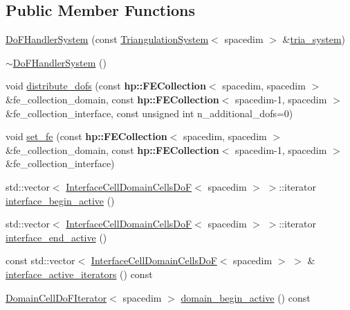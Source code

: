 \subsection*{Public Member Functions}
\begin{DoxyCompactItemize}
\item 
\hyperlink{class_do_f_handler_system_acb31af36eec0abac1d6e764e3d08c7fe}{Do\+F\+Handler\+System} (const \hyperlink{class_triangulation_system}{Triangulation\+System}$<$ spacedim $>$ \&\hyperlink{class_do_f_handler_system_a06d93193cb47591db138cd8f41953796}{tria\+\_\+system})
\item 
\hyperlink{class_do_f_handler_system_a5a2f0389f4f4216b9841d9c518cb107e}{$\sim$\+Do\+F\+Handler\+System} ()
\item 
void \hyperlink{class_do_f_handler_system_ac6e0950ae9d140b0a9185bcfffe167d6}{distribute\+\_\+dofs} (const {\bf hp\+::\+F\+E\+Collection}$<$ spacedim, spacedim $>$ \&fe\+\_\+collection\+\_\+domain, const {\bf hp\+::\+F\+E\+Collection}$<$ spacedim-\/1, spacedim $>$ \&fe\+\_\+collection\+\_\+interface, const unsigned int n\+\_\+additional\+\_\+dofs=0)
\item 
void \hyperlink{class_do_f_handler_system_a1cbcc00826aca94736d3aebef157da72}{set\+\_\+fe} (const {\bf hp\+::\+F\+E\+Collection}$<$ spacedim, spacedim $>$ \&fe\+\_\+collection\+\_\+domain, const {\bf hp\+::\+F\+E\+Collection}$<$ spacedim-\/1, spacedim $>$ \&fe\+\_\+collection\+\_\+interface)
\item 
std\+::vector$<$ \hyperlink{class_interface_cell_domain_cells_do_f}{Interface\+Cell\+Domain\+Cells\+DoF}$<$ spacedim $>$ $>$\+::iterator \hyperlink{class_do_f_handler_system_a88d93ac03defd1b296238de4eb122841}{interface\+\_\+begin\+\_\+active} ()
\item 
std\+::vector$<$ \hyperlink{class_interface_cell_domain_cells_do_f}{Interface\+Cell\+Domain\+Cells\+DoF}$<$ spacedim $>$ $>$\+::iterator \hyperlink{class_do_f_handler_system_aecbc22a86943c1bc921a13ec7e2333f2}{interface\+\_\+end\+\_\+active} ()
\item 
const std\+::vector$<$ \hyperlink{class_interface_cell_domain_cells_do_f}{Interface\+Cell\+Domain\+Cells\+DoF}$<$ spacedim $>$ $>$ \& \hyperlink{class_do_f_handler_system_ae22105dc8db1090f12be9ecaed384228}{interface\+\_\+active\+\_\+iterators} () const 
\item 
\hyperlink{class_domain_cell_do_f_iterator}{Domain\+Cell\+Do\+F\+Iterator}$<$ spacedim $>$ \hyperlink{class_do_f_handler_system_aeee77ce076a84afdae132910c72de3b4}{domain\+\_\+begin\+\_\+active} () const 

\end{DoxyCompactItemize}
